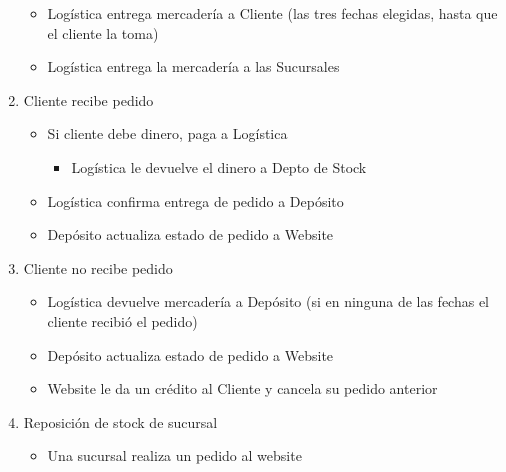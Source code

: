 \begin{enumerate}
\begin{itemize}
    \item Logística entrega mercadería a Cliente (las tres fechas elegidas,
    hasta que el cliente la toma)

    \item Logística entrega la mercadería a las Sucursales

  \end{itemize}

  \item Cliente recibe pedido

  \begin{itemize}

    \item Si cliente debe dinero, paga a Logística

    \begin{itemize}

      \item Logística le devuelve el dinero a Depto de Stock

    \end{itemize}

    \item Logística confirma entrega de pedido a Depósito

    \item Depósito actualiza estado de pedido a Website

  \end{itemize}

  \item Cliente no recibe pedido

  \begin{itemize}

    \item Logística devuelve mercadería a Depósito (si en ninguna de las
    fechas el cliente recibió el pedido)

    \item Depósito actualiza estado de pedido a Website

    \item Website le da un crédito al Cliente y cancela su pedido anterior

  \end{itemize}

  \item Reposición de stock de sucursal

  \begin{itemize}

    \item Una sucursal realiza un pedido al website


\end{itemize}
\end{enumerate}
